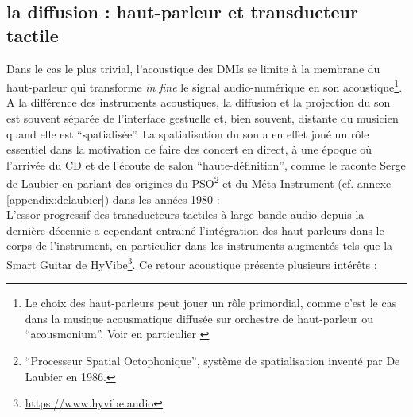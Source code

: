 \subsection{la diffusion : haut-parleur et transducteur tactile}

\noindent Dans le cas le plus trivial, l'acoustique des \glspl{DMI} se limite à la membrane du haut-parleur qui transforme \textit{in fine} le signal audio-numérique en son acoustique\footnote{Le choix des haut-parleurs peut jouer un rôle primordial, comme c'est le cas dans la musique acousmatique diffusée sur orchestre de haut-parleur ou ``acousmonium''. Voir en particulier \cite{mooney_sound_2006}}. A la différence des instruments acoustiques, la diffusion et la projection du son est souvent séparée de l'interface gestuelle et, bien souvent, distante du musicien quand elle est ``spatialisée''. La spatialisation du son a en effet joué un rôle essentiel dans la motivation de faire des concert en direct, à une époque où l'arrivée du \gls{CD} et de l'écoute de salon ``haute-définition'', comme le raconte Serge de Laubier en parlant des origines du PSO\footnote{``Processeur Spatial Octophonique'', système de spatialisation inventé par De Laubier en 1986.} et du Méta-Instrument (cf. annexe \ref{appendix:delaubier}) dans les années 1980 : \\
\indent L'essor progressif des transducteurs tactiles à large bande audio depuis la dernière décennie a cependant entrainé l'intégration des haut-parleurs dans le corps de l'instrument, en particulier dans les instruments augmentés tels que la Smart Guitar de HyVibe\footnote{\url{https://www.hyvibe.audio}}. Ce retour acoustique présente plusieurs intérêts :

